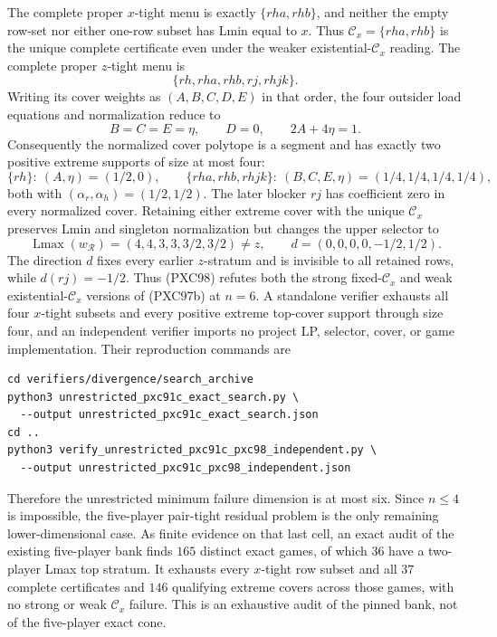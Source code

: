 \documentclass[11pt]{article}
\newcommand{\Lmax}{\operatorname{Lmax}}
\begin{document}
The complete proper $x$-tight menu is exactly
$\{rha,rhb\}$, and neither the empty row-set nor either one-row subset has
Lmin equal to $x$.  Thus
$\mathcal C_x=\{rha,rhb\}$ is the unique complete certificate even under the
weaker existential-$\mathcal C_x$ reading.  The complete proper $z$-tight
menu is
\[
 \{rh,rha,rhb,rj,rhjk\}.
\]
Writing its cover weights as $(A,B,C,D,E)$ in that order, the four outsider
load equations and normalization reduce to
\[
 B=C=E=\eta,\qquad D=0,\qquad 2A+4\eta=1.       \tag{PXC98c}
\]
Consequently the normalized cover polytope is a segment and has exactly two
positive extreme supports of size at most four:
\[
 \{rh\}:\ (A,\eta)=(1/2,0),\qquad
 \{rha,rhb,rhjk\}:\ (B,C,E,\eta)=(1/4,1/4,1/4,1/4),
\]
both with $(\alpha_r,\alpha_h)=(1/2,1/2)$.  The later blocker $rj$ has
coefficient zero in every normalized cover.  Retaining either extreme cover
with the unique $\mathcal C_x$ preserves Lmin and singleton normalization but
changes the upper selector to
\[
 \Lmax(w_{\mathcal R})=(4,4,3,3,3/2,3/2)\ne z,
 \qquad
 d=(0,0,0,0,-1/2,1/2).                         \tag{PXC98d}
\]
The direction $d$ fixes every earlier $z$-stratum and is invisible to all
retained rows, while $d(rj)=-1/2$.  Thus (PXC98) refutes both the strong
fixed-$\mathcal C_x$ and weak existential-$\mathcal C_x$ versions of
(PXC97b) at $n=6$.  A standalone verifier exhausts all four $x$-tight
subsets and every positive extreme top-cover support through size four, and
an independent verifier imports no project LP, selector, cover, or game
implementation.  Their reproduction commands are
\begin{verbatim}
cd verifiers/divergence/search_archive
python3 unrestricted_pxc91c_exact_search.py \
  --output unrestricted_pxc91c_exact_search.json
cd ..
python3 verify_unrestricted_pxc91c_pxc98_independent.py \
  --output unrestricted_pxc91c_pxc98_independent.json
\end{verbatim}
Therefore the unrestricted minimum failure dimension is at most six.  Since
$n\le4$ is impossible, the five-player pair-tight residual problem is the
only remaining lower-dimensional case.
As finite evidence on that last cell, an exact audit of the existing
five-player bank finds $165$ distinct exact games, of which $36$ have a
two-player Lmax top stratum.  It exhausts every $x$-tight row subset and all
$37$ complete certificates and $146$ qualifying extreme covers across those
games, with no strong or weak $\mathcal C_x$ failure.  This is an exhaustive
audit of the pinned bank, not of the five-player exact cone.
\end{document}
